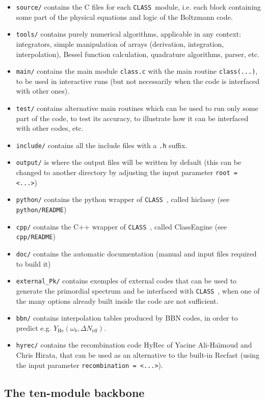 \documentclass{article}
\newcommand\CLASS{{\tt CLASS}~}
\begin{document}
\begin{itemize} 
\item
{\tt source/} contains the C files for each \CLASS module, i.e. each
block containing some part of the physical equations and logic of
the Boltzmann code.
\item
{\tt tools/} contains purely numerical algorithms, applicable in any
context: integrators, simple manipulation of arrays (derivation,
integration, interpolation), Bessel function calculation, quadrature algorithms, parser, etc.
\item {\tt main/} contains the main module {\tt class.c} with the main
  routine {\tt class(...)}, to be used in interactive runs (but not
  necessarily when the code is interfaced with other ones).
\item
{\tt test/} contains alternative main routines which can be used to
run only some part of the code, to test its accuracy, to illustrate how
it can be interfaced with other codes, etc.
\item
{\tt include/} contains all the include files with a {\tt .h} suffix.
\item
{\tt   output/} is where the output files will be written by default (this can be changed to another directory by adjusting the input parameter {\tt root = <...>})
\item
{\tt   python/} contains the python wrapper of \CLASS, called hiclassy (see {\tt python/README}) 
\item
{\tt   cpp/} contains the C++ wrapper of \CLASS, called ClassEngine (see {\tt cpp/README}) 
\item
{\tt   doc/} contains the automatic documentation (manual and input files required to build it)
\item
{\tt   external\_Pk/} contains exemples of external codes that can be used to generate the primordial spectrum and be interfaced with \CLASS, when one of the many options already built inside the code are not sufficient.
\item
{\tt bbn/} contains interpolation tables produced by BBN codes, in order to predict e.g. $Y_\mathrm{He}(\omega_b, \Delta N_\mathrm{eff})$.
\item
{\tt   hyrec/} contains the recombination code HyRec of Yacine Ali-Ha\"{\i}moud and Chris Hirata, that can be used as an alternative to the built-in Recfast (using the input parameter {\tt recombination = <...>}).
\end{itemize}

\subsection{The ten-module backbone}
\end{document}
